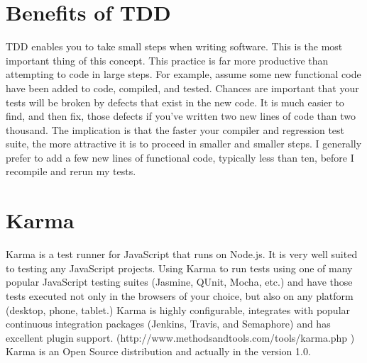 \documentclass[11pt]{article}
\begin{document}
\section{Benefits of TDD}

TDD enables you to take small steps when writing software. This is the most important thing of this concept. This practice is far more productive than attempting to code in large steps. For example, assume some new functional code have been added to code, compiled, and tested. Chances are important that your tests will be broken by defects that exist in the new code. It is much easier to find, and then fix, those defects if you've written two new lines of code than two thousand. The implication is that the faster your compiler and regression test suite, the more attractive it is to proceed in smaller and smaller steps. I generally prefer to add a few new lines of functional code, typically less than ten, before I recompile and rerun my tests.



\section{Karma}

Karma is a test runner for JavaScript that runs on Node.js. It is very well suited to testing any JavaScript projects. Using Karma to run tests using one of many popular JavaScript testing suites (Jasmine, QUnit, Mocha, etc.) and have those tests executed not only in the browsers of your choice, but also on any platform (desktop, phone, tablet.) Karma is highly configurable, integrates with popular continuous integration packages (Jenkins, Travis, and Semaphore) and has excellent plugin support. (http://www.methodsandtools.com/tools/karma.php ) Karma is an Open Source distribution and actually in the version 1.0.
\end{document}
